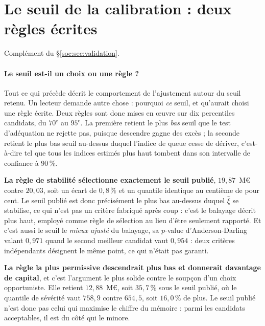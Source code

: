 \section{Le seuil de la calibration : deux règles écrites}
\label{sec:ann-seuil}


Complément du \S\ref{soc:sec:validation}.

\paragraph{Le seuil est-il un choix ou une règle ?}
Tout ce qui précède décrit le comportement de l'ajustement autour du seuil retenu. Un lecteur
demande autre chose : pourquoi \emph{ce} seuil, et qu'aurait choisi une règle écrite. Deux règles
sont donc mises en \oe uvre sur dix percentiles candidats, du $70^{\text{e}}$ au $95^{\text{e}}$.
La première retient le plus \emph{bas} seuil que le test d'adéquation ne rejette pas, puisque
descendre gagne des excès ; la seconde retient le plus bas seuil au-dessus duquel l'indice de
queue cesse de dériver, c'est-à-dire tel que tous les indices estimés plus haut tombent dans son
intervalle de confiance à $90\,\%$.

\textbf{La règle de stabilité sélectionne exactement le seuil publié}, $19{,}87$~M\euro{} contre
$20{,}03$, soit un écart de $0{,}8\,\%$ et un quantile identique au centième de pour cent. Le
seuil publié est donc précisément le plus bas au-dessus duquel $\hat\xi$ se stabilise, ce qui
n'est pas un critère fabriqué après coup : c'est le balayage décrit plus haut, employé comme
règle de sélection au lieu d'être seulement rapporté. Et c'est aussi le seuil le \emph{mieux
ajusté} du balayage, sa $p$-value d'Anderson-Darling valant $0{,}971$ quand le second meilleur
candidat vaut $0{,}954$ : deux critères indépendants désignent le même point, ce qui n'était pas
garanti.

\textbf{La règle la plus permissive descendrait plus bas et donnerait davantage de capital}, et
c'est l'argument le plus solide contre le soupçon d'un choix opportuniste. Elle retient
$12{,}88$~M\euro, soit $35{,}7\,\%$ sous le seuil publié, où le quantile de sévérité vaut
$758{,}9$ contre $654{,}5$, soit $16{,}0\,\%$ de plus. Le seuil publié n'est donc pas celui qui
maximise le chiffre du mémoire : parmi les candidats acceptables, il est du côté qui le minore.

